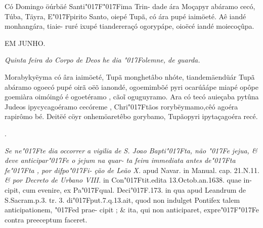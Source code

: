 \documentclass[openany,titlepage,12pt]{book}
\newcommand{\lgS}{\char"017F}
\newcommand{\lgSS}{\char"017F\char"017F}
\begin{document}
{\hspace*{-2ex}Có Domingo öúrbäé Santi\lgSS ima Trin-\linebreak
dade ára Moçapyr abáramo cecó, Túba,\linebreak
Täyra, E\lgS pirito Santo, oiepé Tupã, có ára
pupé iaimöeté. Aê iandé monhangára, tiaie-
ruré ixupé tiandereraçó ogorypápe, oioëcé
iandé moiecoçûpa.}
\newpage

\begin{center}
    EM JUNHO.
\end{center}

\begin{center}
    \textit{\small Quinta feira do Corpo de Deos he dia \lgS olemne,
    de guarda.
    }
\end{center}

{\hspace*{-2ex}Morabykyëyma có âra iaimöeté, Tupã\linebreak
monghetâbo nhóte, tiandemäendüár Tupã
abáramo ogoecó pupé oirã oëõ ianondé,\linebreak
ogoemimbõé pyri ocarúâápe miapé opôpe
goemiàra oimóingó é ogoetéramo , cão\~i\linebreak
oguguyramo. Ara có tecó auieçaba pytûna
Judeos ipycycagoéramo cecóreme , Chri\lgS tãos
rorybëymamo,cêó agoéra rapirômo bé.
Deitëé cöyr onhemöaretêbo gorybamo,\linebreak
Tupãopyri ipytaçagoéra recé.\\}
\unskip
\hspace*{-1.5ex}\begin{minipage}[t]{2ex}
    .
\end{minipage}
\hspace*{1ex}\begin{minipage}[t]{0.96\linewidth}
    \textit{
    \footnotesize \hspace*{-3.5ex}Se ne\lgS te dia occorrer a vigilia de S. Joao Bapti\lgS ta,\linebreak
    não \lgS e jejua, \& deve anticipar\lgS e o jejum na quar-
    ta feira immediata antes de\lgS ta fe\lgS ta , por difpo\lgS i-
    ção de Leão X.} {\small apud Navar. in Manual. cap.\linebreak
    21.N.11.} \textit{\footnotesize \hspace*{0ex}\& por Decreto de Urbano VIII.}
    {\small in Con\lgS tit.edita 13.Octob.an.1638. quae in-\linebreak
    cipit, cum evenire, ex Pa\lgS qual. Deci\lgS .173.\linebreak
    in qua apud Leandrum de S.Sacram.p.3.\linebreak
    tr. 3. di\lgS put.7.q.13.ait, quod non indulget
    Pontifex talem anticipationem, \lgS ed prae-\linebreak
    cipit ; \& ita, qui non anticiparet, expre\lgSS e
    contra preeceptum faceret.}
    \newline\vspace*{4pt}
\end{minipage}
\end{document}
